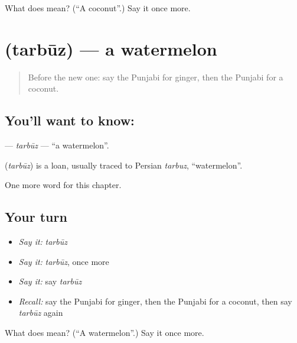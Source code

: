 \begin{tcolorbox}[breakable,colback=teal!4,colframe=teal!35!black,title={Before you move on}]
What does  mean? (\textquotedblleft{}A coconut\textquotedblright{}.) Say it once more.
\end{tcolorbox}
\section[\texorpdfstring{\pa{ਤਰਬੂਜ਼} (tarbūz)}{ਤਰਬੂਜ਼ (tarbūz)}]{ (tarbūz) — a watermelon}

\label{lesson:PA-C123-tarbuz}



\begin{quote}
Before the new one: say the Punjabi for ginger, then the Punjabi for a coconut.
\end{quote}

\subsection*{You'll want to know: }
\textbf{} — \emph{tarbūz} — \textquotedblleft{}a watermelon\textquotedblright{}.

\begin{cousinweb}
\textbf{} (\emph{tarbūz}) is a loan, usually traced to Persian \emph{tarbuz}, \textquotedblleft{}watermelon\textquotedblright{}.
\end{cousinweb}

\begin{grammarlens}[title={What you've built}]
One more word for this chapter.
\end{grammarlens}

\subsection*{Your turn}
\begin{itemize}
\raggedright
  \item \emph{Say it:} \emph{tarbūz}
  \item \emph{Say it:} \emph{tarbūz}, once more
  \item \emph{Say it:} say \emph{tarbūz}
  \item \emph{Recall:} say the Punjabi for ginger, then the Punjabi for a coconut, then say \emph{tarbūz} again
\end{itemize}

\begin{tcolorbox}[breakable,colback=teal!4,colframe=teal!35!black,title={Before you move on}]
What does  mean? (\textquotedblleft{}A watermelon\textquotedblright{}.) Say it once more.
\end{tcolorbox}
